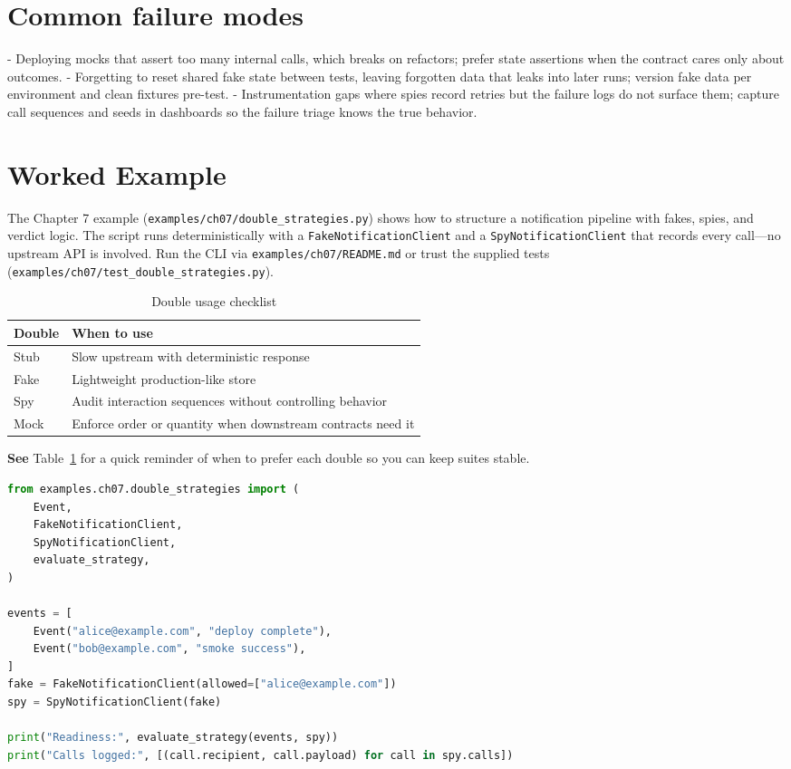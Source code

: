 \section{Common failure modes}
- Deploying mocks that assert too many internal calls, which breaks on refactors; prefer state assertions when the contract cares only about outcomes.
- Forgetting to reset shared fake state between tests, leaving forgotten data that leaks into later runs; version fake data per environment and clean fixtures pre-test.
- Instrumentation gaps where spies record retries but the failure logs do not surface them; capture call sequences and seeds in dashboards so the failure triage knows the true behavior.

\section{Worked Example}
The Chapter 7 example (\texttt{examples/ch07/double\_strategies.py}) shows how to structure a notification pipeline with fakes, spies, and verdict logic. The script runs deterministically with a \texttt{FakeNotificationClient} and a \texttt{SpyNotificationClient} that records every call—no upstream API is involved. Run the CLI via \texttt{examples/ch07/README.md} or trust the supplied tests (\texttt{examples/ch07/test\_double\_strategies.py}).

\begin{table}[h]
\centering
\caption{Double usage checklist}
\label{tab:doubles-usage}
\begin{tabular}{p{3cm}p{5cm}}
\toprule
Double & When to use \\
\midrule
Stub & Slow upstream with deterministic response \\
Fake & Lightweight production-like store\\
Spy & Audit interaction sequences without controlling behavior\\
Mock & Enforce order or quantity when downstream contracts need it\\
\bottomrule
\end{tabular}
\end{table}

\textbf{See} Table~\ref{tab:doubles-usage} for a quick reminder of when to prefer each double so you can keep suites stable.

\begin{lstlisting}[language=python, caption={Notification pipeline using fakes and spies.}, label=lst:ch07-double-strategies]
from examples.ch07.double_strategies import (
    Event,
    FakeNotificationClient,
    SpyNotificationClient,
    evaluate_strategy,
)

events = [
    Event("alice@example.com", "deploy complete"),
    Event("bob@example.com", "smoke success"),
]
fake = FakeNotificationClient(allowed=["alice@example.com"])
spy = SpyNotificationClient(fake)

print("Readiness:", evaluate_strategy(events, spy))
print("Calls logged:", [(call.recipient, call.payload) for call in spy.calls])
\end{lstlisting}

